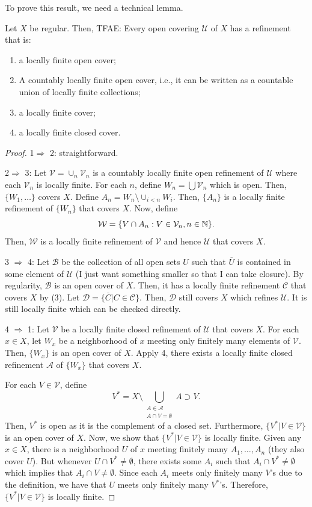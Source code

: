 To prove this result, we need a technical lemma.
\begin{lemma}
    Let $X$ be regular. Then, TFAE:
    Every open covering $\mathcal{U}$ of $X$ has a refinement that is:
    \begin{enumerate}
        \item a locally finite open cover;
        \item A countably locally finite open cover, i.e., it can be written as a countable union of locally finite collections;
        \item a locally finite cover;
        \item a locally finite closed cover.
    \end{enumerate}
\end{lemma}
\begin{proof}
    1\(\Rightarrow\) 2: straightforward.

    2\(\Rightarrow\) 3: Let $\mathcal{V}=\cup_n\mathcal{V}_n$ is a countably locally finite open refinement of $\mathcal{U}$ where each $\mathcal{V}_n$ is locally finite. For each $n$, define $W_n=\bigcup\mathcal{V}_n$ which is open. Then, $\{W_1,\ldots\}$ covers $X$. Define $A_n=W_n\setminus \cup_{i<n}W_i$. Then, $\{A_n\}$ is a locally finite refinement of $\{W_n\}$ that covers $X$. Now, define
    \[\mathcal{W}=\{V\cap A_n:V\in \mathcal{V}_n,n\in \mathbb{N}\}.\]
    Then, $\mathcal{W}$ is a locally finite refinement of $\mathcal{V}$ and hence $\mathcal{U}$ that covers $X$.

    3 \(\Rightarrow\) 4: Let $\mathcal{B}$ be the collection of all open sets $U$ such that $\overline{U}$ is contained in some element of $\mathcal{U}$ (I just want something smaller so that I can take closure). By regularity, $\mathcal{B}$ is an open cover of $X$. Then, it has a locally finite refinement $\mathcal{C}$ that covers $X$ by (3). Let $\mathcal{D}=\{\overline{C}|C\in \mathcal{C}\}$. Then, $\mathcal{D}$ still covers $X$ which refines $\mathcal{U}$. It is still locally finite which can be checked directly. 

    4 \(\Rightarrow\) 1: Let $\mathcal{V}$ be a locally finite closed refinement of $\mathcal{U}$ that covers $X$. For each $x\in X$, let $W_x$ be a neighborhood of $x$ meeting only finitely many elements of $\mathcal{V}$. Then, $\{W_x\}$ is an open cover of $X$. Apply 4, there exists a locally finite closed refinement $\mathcal{A}$ of $\{W_x\}$ that covers $X$. 

    For each $V\in \mathcal{V}$, define
    \[V^*=X\setminus \bigcup_{\substack{A\in \mathcal{A}\\A\cap V=\emptyset}}A\supset V.\]
    Then, $V^*$ is open as it is the complement of a closed set. Furthermore, $\{V^*|V\in \mathcal{V}\}$ is an open cover of $X$. Now, we show that $\{V^*|V\in \mathcal{V}\}$ is locally finite. Given any $x\in X$, there is a neighborhood $U$ of $x$ meeting finitely many $A_1,\ldots, A_n$ (they also cover $U$). But whenever $U\cap V^*\neq \emptyset$, there exists some $A_i$ such that $A_i\cap V^*\neq \emptyset$ which implies that $A_i\cap V\neq \emptyset$. Since each $A_i$ meets only finitely many $V$'s due to the definition, we have that $U$ meets only finitely many $V^*$'s. Therefore, $\{V^*|V\in \mathcal{V}\}$ is locally finite.
    

\end{proof}
